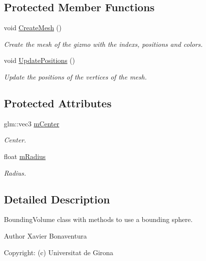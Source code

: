 \subsection*{Protected Member Functions}
\begin{DoxyCompactItemize}
\item 
void \hyperlink{class_bounding_sphere_a8bed6b6f60b7676d09c45b41db2032e6}{Create\+Mesh} ()
\begin{DoxyCompactList}\small\item\em Create the mesh of the gizmo with the indexs, positions and colors. \end{DoxyCompactList}\item 
void \hyperlink{class_bounding_sphere_ab1d394277a8f79bc970765af75273319}{Update\+Positions} ()
\begin{DoxyCompactList}\small\item\em Update the positions of the vertices of the mesh. \end{DoxyCompactList}\end{DoxyCompactItemize}
\subsection*{Protected Attributes}
\begin{DoxyCompactItemize}
\item 
glm\+::vec3 \hyperlink{class_bounding_sphere_a9975e7a417553c4f425e050f198122a1}{m\+Center}
\begin{DoxyCompactList}\small\item\em Center. \end{DoxyCompactList}\item 
float \hyperlink{class_bounding_sphere_a305aa1ba8daf58a8834547d4e0c15e7b}{m\+Radius}
\begin{DoxyCompactList}\small\item\em Radius. \end{DoxyCompactList}\end{DoxyCompactItemize}


\subsection{Detailed Description}
Bounding\+Volume class with methods to use a bounding sphere. 

\begin{DoxyAuthor}{Author}
Xavier Bonaventura 

Copyright\+: (c) Universitat de Girona 
\end{DoxyAuthor}


